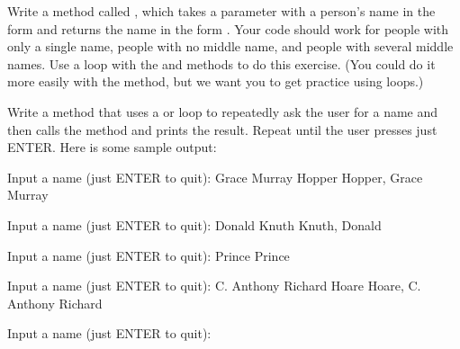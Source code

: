 \begin{exercise}
Write a method called , which takes a  parameter with a person's name in the form  and returns the name in the form .  Your code should work for people with only a single name, people with no middle name, and people with several middle names.
Use a  loop with the  and  methods to do this exercise. (You could do it more easily with the  method, but we want you to get practice using loops.)

Write a  method that uses a  or  loop to repeatedly ask the user for a name and then calls the  method and prints the result. Repeat until the user presses just ENTER. Here is some sample output:

\begin{stdout}
Input a name (just ENTER to quit): Grace Murray Hopper
Hopper, Grace Murray

Input a name (just ENTER to quit): Donald Knuth   
Knuth, Donald

Input a name (just ENTER to quit): Prince
Prince

Input a name (just ENTER to quit): C. Anthony Richard Hoare
Hoare, C. Anthony Richard

Input a name (just ENTER to quit): 
\end{stdout}

\end{exercise}

